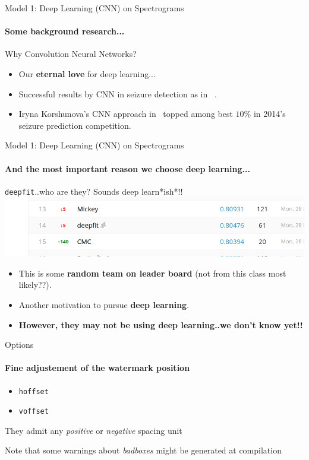 \documentclass{beamer}
\begin{document}
\begin{frame}{Model 1: Deep Learning (CNN) on Spectrograms}
  \framesubtitle{Some background research...}

  \begin{block}{Why Convolution Neural Networks?}
    \begin{itemize}
    \item Our \textbf{eternal love} for deep learning...
    \item Successful results by CNN in seizure detection as in
      ~\cite{korshunova_faculty_2015,mirowski2008comparing}.
    \item Iryna Korshunova's CNN approach in~\cite{korshunova_faculty_2015}
      topped among best $10\%$ in 2014's seizure prediction competition.
    \end{itemize}
  \end{block}
\end{frame}


\begin{frame}{Model 1: Deep Learning (CNN) on Spectrograms}
  \framesubtitle{And the most important reason we choose deep learning...}
  
  \begin{block}{\texttt{deepfit}..who are they? Sounds deep learn*ish*!!}
    \includegraphics[scale=0.3]{img/who_are_they.png}
  \end{block}


  \begin{itemize}
  \item This is some \textbf{random team on leader board} (not from this class most likely??).
  \item Another motivation to pursue \textbf{deep learning}.
    \pause
  \item \textbf{However, they may not be using deep learning..we don't know yet!!}

  \end{itemize}

\end{frame}
\setwatermark[hoffset=-3cm,voffset=-2cm]{\fontsize{125pt}{125pt}\selectfont{Simple}}


\begin{frame}{Options}
  \framesubtitle{Fine adjustement of the watermark position}

  
  \begin{itemize}
    \item \texttt{hoffset}
    \item \texttt{voffset}
  \end{itemize}
  
  They admit any \emph{positive} or \emph{negative} spacing \alert{unit}
  
  Note that some \alert{warnings} about \emph{badboxes} might be generated at compilation

\end{frame}
\end{document}
